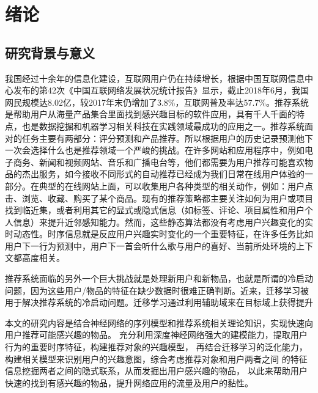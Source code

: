 \chapter{绪论}
\section{研究背景与意义}

我国经过十余年的信息化建设，互联网用户仍在持续增长，根据中国互联网信息中心发布的第42次《中国互联网络发展状况统计报告》显示，截止2018年6月，我国网民规模达8.02亿，较2017年末仍增加了3.8\%，互联网普及率达57.7\%。推荐系统是帮助用户从海量产品集合里面找到感兴趣目标的软件应用，具有千人千面的特点，也是数据挖掘和机器学习相关科技在实践领域最成功的应用之一。推荐系统面对的任务主要有两部分：评分预测和产品推荐。所以根据用户的历史记录预测他下一次会选择什么也是推荐领域一个严峻的挑战。在许多网站和应用程序中，例如电子商务、新闻和视频网站、音乐和广播电台等，他们都需要为用户推荐可能喜欢物品的杰出服务，如今接收不同形式的自动推荐已经成为我们日常在线用户体验的一部分。在典型的在线网站上面，可以收集用户各种类型的相关动作，例如：用户点击、浏览、收藏、购买了某个商品。现有的推荐策略都主要关注如何为用户或项目找到临近集，或者利用其它的显式或隐式信息（如标签、评论、项目属性和用户个人信息）来提升近邻感知能力。然而，这些静态算法都没有考虑用户兴趣变化的实时动态性。时序信息就是反应用户兴趣实时变化的一个重要特征，在许多任务比如用户下一行为预测中，用户下一首会听什么歌与用户的喜好、当前所处环境的上下文都高度相关。

推荐系统面临的另外一个巨大挑战就是处理新用户和新物品，也就是所谓的冷启动问题，因为这些用户/物品的特征在缺少数据时很难正确判断。近来，迁移学习被用于解决推荐系统的冷启动问题。迁移学习通过利用辅助域来在目标域上获得提升



本文的研究内容是结合神经网络的序列模型和推荐系统相关理论知识，实现快速向用户推荐可能感兴趣的物品。%
充分利用深度神经网络强大的建模能力，提取用户行为的重要时序特征，构建推荐对象的兴趣模型，%
再结合迁移学习的泛化能力，构建相关模型来识别用户的兴趣意图，综合考虑推荐对象和用户两者之间%
的特征信息挖掘两者之间的隐式联系，从而发掘出用户感兴趣的物品，
以此来帮助用户快速的找到有感兴趣的物品，提升网络应用的流量及用户的黏性。%

